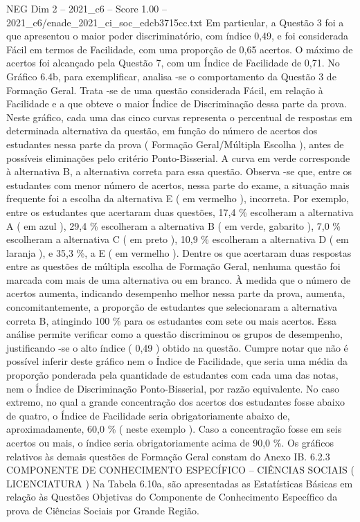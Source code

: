 \begin{textsample}{NEG Dim 2 – 2021\_c6 – Score 1.00 – 2021\_c6/enade\_2021\_ci\_soc\_edcb3715cc.txt}
Em particular, a Questão 3 foi a que apresentou o maior poder discriminatório, com índice 0,49, e foi considerada Fácil em termos de Facilidade, com uma proporção de 0,65 acertos.
O máximo de acertos foi alcançado pela Questão 7, com um Índice de Facilidade de 0,71.
No Gráfico 6.4b, para exemplificar, analisa -se o comportamento da Questão 3 de Formação Geral.
Trata -se de uma questão considerada Fácil, em relação à Facilidade e a que obteve o maior Índice de Discriminação dessa parte da prova.
Neste gráfico, cada uma das cinco curvas representa o percentual de respostas em determinada alternativa da questão, em função do número de acertos dos estudantes nessa parte da prova ( Formação Geral/Múltipla Escolha ), antes de possíveis eliminações pelo critério Ponto-Bisserial.
A curva em verde corresponde à alternativa B, a alternativa correta para essa questão.
Observa -se que, entre os estudantes com menor número de acertos, nessa parte do exame, a situação mais frequente foi a escolha da alternativa E ( em vermelho ), incorreta.
Por exemplo, entre os estudantes que acertaram duas questões, 17,4 \% escolheram a alternativa A ( em azul ), 29,4 \% escolheram a alternativa B ( em verde, gabarito ), 7,0 \% escolheram a alternativa C ( em preto ), 10,9 \% escolheram a alternativa D ( em laranja ), e 35,3 \%, a E ( em vermelho ).
Dentre os que acertaram duas respostas entre as questões de múltipla escolha de Formação Geral, nenhuma questão foi marcada com mais de uma alternativa ou em branco.
À medida que o número de acertos aumenta, indicando desempenho melhor nessa parte da prova, aumenta, concomitantemente, a proporção de estudantes que selecionaram a alternativa correta B, atingindo 100 \% para os estudantes com sete ou mais acertos.
Essa análise permite verificar como a questão discriminou os grupos de desempenho, justificando -se o alto índice ( 0,49 ) obtido na questão.
Cumpre notar que não é possível inferir deste gráfico nem o Índice de Facilidade, que seria uma média da proporção ponderada pela quantidade de estudantes com cada uma das notas, nem o Índice de Discriminação Ponto-Bisserial, por razão equivalente.
No caso extremo, no qual a grande concentração dos acertos dos estudantes fosse abaixo de quatro, o Índice de Facilidade seria obrigatoriamente abaixo de, aproximadamente, 60,0 \% ( neste exemplo ).
Caso a concentração fosse em seis acertos ou mais, o índice seria obrigatoriamente acima de 90,0 \%.
Os gráficos relativos às demais questões de Formação Geral constam do Anexo IB. 6.2.3 COMPONENTE DE CONHECIMENTO ESPECÍFICO – CIÊNCIAS SOCIAIS ( LICENCIATURA ) Na Tabela 6.10a, são apresentadas as Estatísticas Básicas em relação às Questões Objetivas do Componente de Conhecimento Específico da prova de Ciências Sociais por Grande Região.

\end{textsample}
